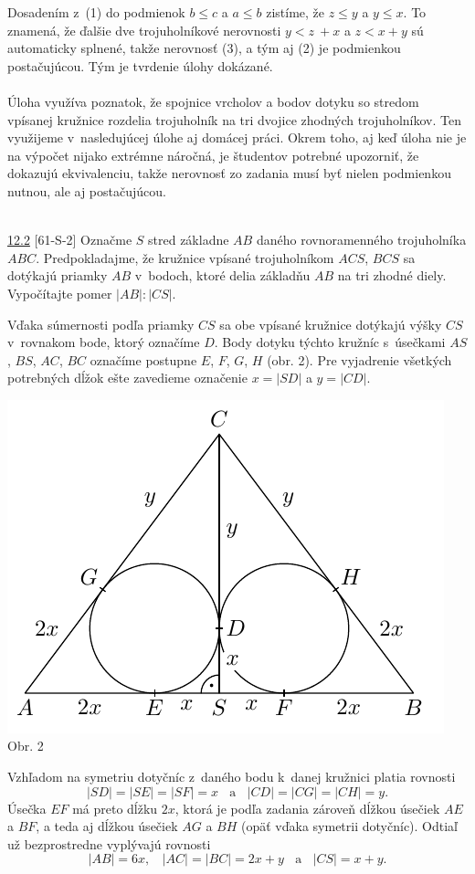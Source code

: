 Dosadením z~(1) do podmienok $b \leq c$ a $a \leq b$ zistíme, že $z \leq y$ a $y \leq x$. To znamená, že ďalšie dve trojuholníkové nerovnosti $y < z~+ x$ a $z < x + y$ sú automaticky splnené, takže nerovnosť (3), a tým aj (2) je podmienkou postačujúcou. Tým je tvrdenie úlohy dokázané.\\
\\
\kom Úloha využíva poznatok, že spojnice vrcholov a bodov dotyku so stredom vpísanej kružnice rozdelia trojuholník na tri dvojice zhodných trojuholníkov. Ten využijeme v~nasledujúcej úlohe aj domácej práci. Okrem toho, aj keď úloha nie je na výpočet nijako extrémne náročná, je študentov potrebné upozorniť, že dokazujú ekvivalenciu, takže nerovnosť zo zadania musí byť nielen podmienkou nutnou, ale aj postačujúcou.\\
\\
\begin{tcolorbox}[breakable,notitle,boxrule=0pt,colback=light-gray,colframe=light-gray]\ul{12.2} [61-S-2] Označme $S$ stred základne $AB$ daného rovnoramenného trojuholníka $ABC$. Predpokladajme, že kružnice vpísané trojuholníkom $ACS$, $BCS$ sa dotýkajú priamky $AB$ v~bodoch, ktoré delia základňu $AB$ na tri zhodné diely. Vypočítajte pomer $|AB| : |CS|$.

\end{tcolorbox}

\rieh Vďaka súmernosti podľa priamky $CS$ sa obe vpísané kružnice dotýkajú výšky $CS$ v~rovnakom bode, ktorý označíme $D$. Body dotyku týchto kružníc s~úsečkami $AS$, $BS$, $AC$, $BC$ označíme postupne $E$, $F$, $G$, $H$ (obr. 2). Pre vyjadrenie všetkých potrebných dĺžok ešte zavedieme označenie $x = |SD|$ a $y = |CD|$.
\begin{center}
\includegraphics{obrazky/61S2}\\

Obr. 2
\end{center}
Vzhľadom na symetriu dotyčníc z~daného bodu k~danej kružnici platia rovnosti
$$|SD| = |SE| = |SF| = x \ \ \ \ \text{a} \ \ \ \ |CD| = |CG| = |CH| = y.$$
Úsečka $EF$ má preto dĺžku $2x$, ktorá je podľa zadania zároveň dĺžkou úsečiek $AE$ a $BF$, a teda aj dĺžkou úsečiek $AG$ a $BH$ (opäť vďaka symetrii dotyčníc). Odtiaľ už bezprostredne vyplývajú rovnosti
$$|AB| = 6x, \ \ \ \ |AC| = |BC| = 2x + y \ \ \ \ \text{a} \ \ \ \  |CS| = x + y.$$

